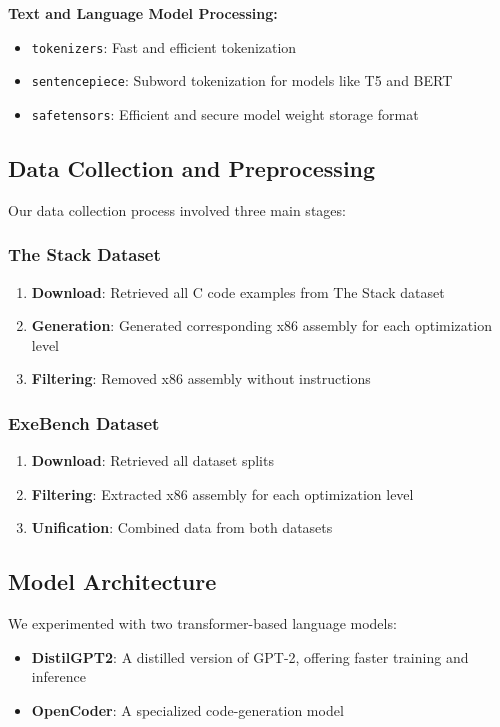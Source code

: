 \documentclass[conference]{IEEEtran}
\begin{document}
\textbf{Text and Language Model Processing:}
\begin{itemize}
\item \texttt{tokenizers}: Fast and efficient tokenization
\item \texttt{sentencepiece}: Subword tokenization for models like T5 and BERT
\item \texttt{safetensors}: Efficient and secure model weight storage format
\end{itemize}

\subsection{Data Collection and Preprocessing}

Our data collection process involved three main stages:

\subsubsection{The Stack Dataset}
\begin{enumerate}
\item \textbf{Download}: Retrieved all C code examples from The Stack dataset
\item \textbf{Generation}: Generated corresponding x86 assembly for each optimization level
\item \textbf{Filtering}: Removed x86 assembly without instructions
\end{enumerate}

\subsubsection{ExeBench Dataset}
\begin{enumerate}
\item \textbf{Download}: Retrieved all dataset splits
\item \textbf{Filtering}: Extracted x86 assembly for each optimization level
\item \textbf{Unification}: Combined data from both datasets
\end{enumerate}

\subsection{Model Architecture}

We experimented with two transformer-based language models:

\begin{itemize}
\item \textbf{DistilGPT2}: A distilled version of GPT-2, offering faster training and inference
\item \textbf{OpenCoder}: A specialized code-generation model
\end{itemize}
\end{document}
